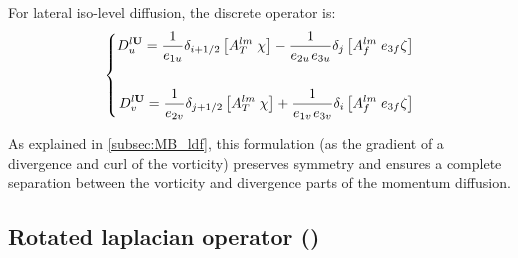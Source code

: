 \documentclass[../main/NEMO_manual]{subfiles}
\begin{document}
For lateral iso-level diffusion, the discrete operator is:
\begin{equation}
  \label{eq:DYN_ldf_lap}
  \left\{
    \begin{aligned}
      D_u^{l{\mathrm {\mathbf U}}} =\frac{1}{e_{1u} }\delta_{i+1/2} \left[ {A_T^{lm}
          \;\chi } \right]-\frac{1}{e_{2u} {\kern 1pt}e_{3u} }\delta_j \left[
        {A_f^{lm} \;e_{3f} \zeta } \right] \\ \\
      D_v^{l{\mathrm {\mathbf U}}} =\frac{1}{e_{2v} }\delta_{j+1/2} \left[ {A_T^{lm}
          \;\chi } \right]+\frac{1}{e_{1v} {\kern 1pt}e_{3v} }\delta_i \left[
        {A_f^{lm} \;e_{3f} \zeta } \right]
    \end{aligned}
  \right.
\end{equation}

As explained in \autoref{subsec:MB_ldf},
this formulation (as the gradient of a divergence and curl of the vorticity) preserves symmetry and
ensures a complete separation between the vorticity and divergence parts of the momentum diffusion.

\subsection[Rotated laplacian (\forcode{ln_dynldf_iso})]{Rotated laplacian operator (\protect{})}
\label{subsec:DYN_ldf_iso}
\end{document}
